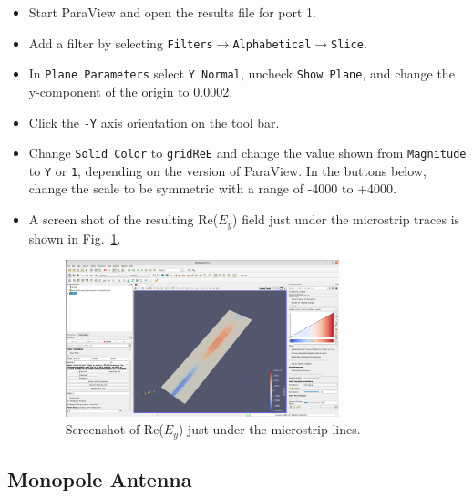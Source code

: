 \documentclass[titlepage]{article}
\renewcommand\_{\textunderscore\linebreak[1]}
\begin{document}
\begin{itemize}
The output from OpenParEM3D shows the results from the 2D port simulations, and the impedances for the input and output ports are 47.59~$\Omega$ and 33.25~$\Omega$, respectively.  Considering just the transmission lines, the return loss from these impedances is 20*log10(abs(33.25-47.59)/(33.25+47.59))=-15.02~dB, which is very close to the computed value of -14.96~dB.  Note also the expected close values for \textbar S11\textbar and \textbar S22\textbar.
\item Start ParaView and open the results file for port 1.
\item Add a filter by selecting \texttt{Filters}$\rightarrow$\texttt{Alphabetical}$\rightarrow$\texttt{Slice}.
\item In \texttt{Plane Parameters} select \texttt{Y Normal}, uncheck \texttt{Show Plane}, and change the y-component of the origin to 0.0002.
\item Click the \texttt{-Y} axis orientation on the tool bar.
\item Change \texttt{Solid Color} to \texttt{gridReE} and change the value shown from \texttt{Magnitude} to \texttt{Y} or \texttt{1}, depending on the version of ParaView.  In the buttons below, change the scale to be symmetric with a range of -4000 to +4000.
\item A screen shot of the resulting Re($E_y$) field just under the microstrip traces is shown in Fig.~\ref{fig:microstrip_ReEy}.
\begin{figure}[H]
  \centering
  \includegraphics[width=0.75\textwidth]{../tutorials/OpenParEM3D/microstrip_step/screenshots/microstrip_ReEy}
  \caption{Screenshot of Re($E_y$) just under the microstrip lines.}
  \label{fig:microstrip_ReEy}
\end{figure}

\end{itemize}

\subsection{Monopole Antenna}
\label{sec:monpoleantenna}
\end{document}
